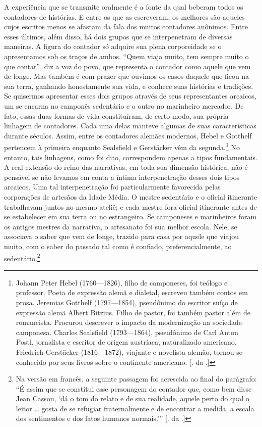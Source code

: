 A experiência que se transmite oralmente é a fonte da qual beberam todos
os contadores de histórias. E entre os que as escreveram, os melhores
são aqueles cujos escritos menos se afastam da fala dos muitos
contadores anônimos. Entre esses últimos, além disso, há dois grupos que
se interpenetram de diversas maneiras. A figura do contador só adquire
sua plena corporeidade se o apresentamos sob os traços de ambos. ``Quem
viaja muito, tem sempre muito o que contar'', diz a voz do povo, que
representa o contador como aquele que vem de longe. Mas também é com
prazer que ouvimos os casos daquele que ficou na sua terra, ganhando
honestamente sua vida, e conhece suas histórias e tradições. Se
quisermos apresentar esses dois grupos através de seus representantes
arcaicos, um se encarna no camponês sedentário e o outro no marinheiro
mercador. De fato, essas duas formas de vida constituíram, de certo
modo, sua própria linhagem de contadores. Cada uma delas manteve algumas
de suas características durante séculos. Assim, entre os contadores
alemães modernos, Hebel e Gotthelf pertencem à primeira enquanto
Sealsfield e Gerstäcker vêm da segunda.\footnote{Johann Peter Hebel
  (1760---1826), filho de camponeses, foi teólogo e professor. Poeta de
  expressão alemã e dialetal, escreveu também contos em prosa. Jeremias
  Gotthelf (1797---1854), pseudônimo do escritor suíço de expressão alemã
  Albert Bitzius. Filho de pastor, foi também pastor além de romancista.
  Procurou descrever o impacto da modernização na sociedade camponesa.
  Charles Sealsfield (1793---1864), pseudônimo de Carl Anton Postl,
  jornalista e escritor de origem austríaca, naturalizado americano.
  Friedrich Gerstäcker (1816---1872), viajante e novelista alemão,
  tornou-se conhecido por seus livros sobre o continente americano.
  [. da .]} No entanto, tais linhagens, como foi dito,
correspondem apenas a tipos fundamentais. A real extensão do reino das
narrativas, em toda sua dimensão histórica, não é pensável se não
levamos em conta a íntima interpenetração desses dois tipos arcaicos.
Uma tal interpenetração foi particularmente favorecida pelas corporações
de artesãos da Idade Média. O mestre sedentário e o oficial itinerante trabalhavam juntos no mesmo ateliê; e cada mestre fora oficial itinerante
antes de se estabelecer em sua terra ou no estrangeiro. Se camponeses e
marinheiros foram os antigos mestres da narrativa, o artesanato foi sua
melhor escola. Nele, se associava o saber que vem de longe, trazido para
casa por aquele que viajou muito, com o saber do passado tal como 
é confiado, preferencialmente, ao sedentário.\footnote{Na versão em
  francês, a seguinte passagem foi acrescida ao final do parágrafo: ``É
  assim que se constitui esse personagem do contador que, como bem disse
  Jean Cassou, `dá o tom do relato e de sua realidade, aquele perto do
  qual o leitor \ldots{} gosta de se refugiar fraternalmente e de
  encontrar a medida, a escala dos sentimentos e dos fatos humanos
  normais.''' [. da .]}

